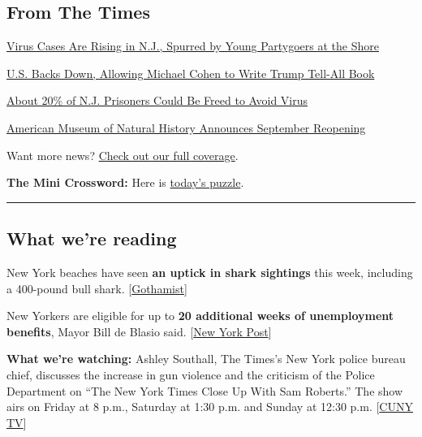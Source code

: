 \hypertarget{from-the-times}{%
\subsection{From The Times}\label{from-the-times}}

\href{https://www.nytimes3xbfgragh.onion/2020/07/30/nyregion/coronavirus-cases-nj.html}{Virus
Cases Are Rising in N.J., Spurred by Young Partygoers at the Shore}

\href{https://www.nytimes3xbfgragh.onion/2020/07/30/nyregion/michael-cohen-donald-trump-book.html}{U.S.
Backs Down, Allowing Michael Cohen to Write Trump Tell-All Book}

\href{https://www.nytimes3xbfgragh.onion/2020/07/30/nyregion/New-jersey-inmate-release-Covid.html}{About
20\% of N.J. Prisoners Could Be Freed to Avoid Virus}

\href{https://www.nytimes3xbfgragh.onion/2020/07/30/arts/design/american-museum-of-natural-history-reopen-covid.html}{American
Museum of Natural History Announces September Reopening}

Want more news?
\href{https://www.nytimes3xbfgragh.onion/section/nyregion}{Check out our
full coverage}.

\textbf{The Mini Crossword:} Here is
\href{https://www.nytimes3xbfgragh.onion/crosswords/game/mini}{today's
puzzle}.

\begin{center}\rule{0.5\linewidth}{\linethickness}\end{center}

\hypertarget{what-were-reading}{%
\subsection{What we're reading}\label{what-were-reading}}

New York beaches have seen \textbf{an uptick in shark sightings} this
week, including a 400-pound bull shark.
{[}\href{https://gothamist.com/news/400-pound-shark-caught-long-island-amid-uptick-shark-sightings-ny-beaches}{Gothamist}{]}

New Yorkers are eligible for up to \textbf{20 additional weeks of
unemployment benefits}, Mayor Bill de Blasio said.
{[}\href{https://nypost.com/2020/07/30/new-yorkers-eligible-for-20-extra-weeks-of-unemployment-de-blasio/}{New
York Post}{]}

\textbf{What we're watching:} Ashley Southall, The Times's New York
police bureau chief, discusses the increase in gun violence and the
criticism of the Police Department on ``The New York Times Close Up With
Sam Roberts.'' The show airs on Friday at 8 p.m., Saturday at 1:30 p.m.
and Sunday at 12:30 p.m.
{[}\href{https://tv.cuny.edu/show/nytcloseup}{CUNY TV}{]}

